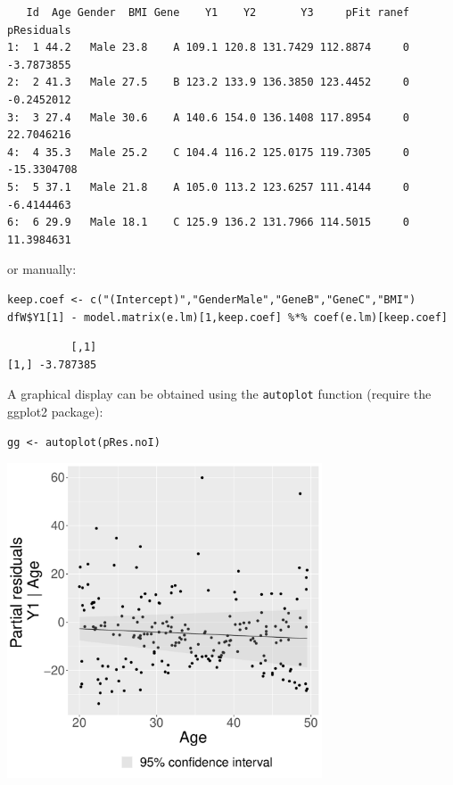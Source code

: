 \documentclass[12pt]{article}
\begin{document}
\begin{verbatim}
   Id  Age Gender  BMI Gene    Y1    Y2       Y3     pFit ranef  pResiduals
1:  1 44.2   Male 23.8    A 109.1 120.8 131.7429 112.8874     0  -3.7873855
2:  2 41.3   Male 27.5    B 123.2 133.9 136.3850 123.4452     0  -0.2452012
3:  3 27.4   Male 30.6    A 140.6 154.0 136.1408 117.8954     0  22.7046216
4:  4 35.3   Male 25.2    C 104.4 116.2 125.0175 119.7305     0 -15.3304708
5:  5 37.1   Male 21.8    A 105.0 113.2 123.6257 111.4144     0  -6.4144463
6:  6 29.9   Male 18.1    C 125.9 136.2 131.7966 114.5015     0  11.3984631
\end{verbatim}

or manually:
\lstset{language=r,label= ,caption= ,captionpos=b,numbers=none}
\begin{lstlisting}
keep.coef <- c("(Intercept)","GenderMale","GeneB","GeneC","BMI")
dfW$Y1[1] - model.matrix(e.lm)[1,keep.coef] %*% coef(e.lm)[keep.coef]
\end{lstlisting}

\begin{verbatim}
          [,1]
[1,] -3.787385
\end{verbatim}

A graphical display can be obtained using the \texttt{autoplot} function
(require the ggplot2 package):
\lstset{language=r,label= ,caption= ,captionpos=b,numbers=none}
\begin{lstlisting}
gg <- autoplot(pRes.noI)
\end{lstlisting}

\begin{center}
\includegraphics[width=0.7\textwidth]{./figures/fig-butils-plotConf-noI.pdf}
\end{center}
\end{document}
